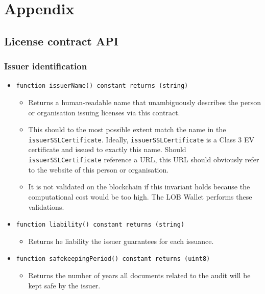 \documentclass[a4paper]{article}
\begin{document}
\clearpage

\section{Appendix}

\subsection{License contract API}
\label{ch:licenseContractAPI}

\subsubsection{Issuer identification}

\begin{itemize}
  \item \texttt{function issuerName() constant returns (string)}
  \begin{itemize}
    \item Returns a human-readable name that unambiguously describes the person or organisation issuing licenses via this contract.
    \item This should to the most possible extent match the name in the \texttt{issuerSSLCertificate}. Ideally, \texttt{issuerSSLCertificate} is a Class 3 EV certificate and issued to exactly this name. Should \texttt{issuerSSLCertificate} reference a URL, this URL should obviously refer to the website of this person or organisation.
    \item It is not validated on the blockchain if this invariant holds because the computational cost would be too high. The LOB Wallet performs these validations.
  \end{itemize}
  
  \item \texttt{function liability() constant returns (string)}
  \begin{itemize}
    \item Returns he liability the issuer guarantees for each issuance.
  \end{itemize}
  
  \item \texttt{function safekeepingPeriod() constant returns (uint8)}
  \begin{itemize}
    \item Returns the number of years all documents related to the audit will be kept safe by the issuer.
  \end{itemize}
  

\end{itemize}
\end{document}
